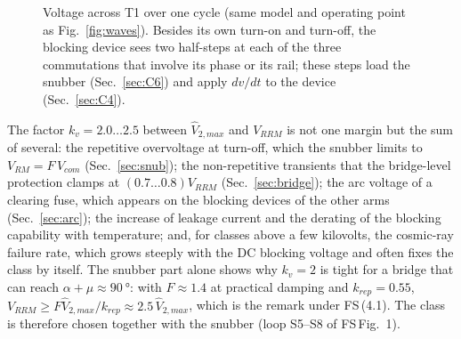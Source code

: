 \documentclass[10pt,a4paper]{scrartcl}
\newcommand{\VRRM}{V_{RRM}}
\newcommand{\fs}[1]{\textsf{FS}\,(#1)}
\newcommand{\fsfig}[1]{\textsf{FS}\,Fig.~#1}
\begin{document}
\begin{figure}[htb]
\caption{Voltage across T1 over one cycle (same model and operating point as Fig.~\ref{fig:waves}). Besides its own turn-on and turn-off, the blocking device sees two half-steps at each of the three commutations that involve its phase or its rail; these steps load the snubber (Sec.~\ref{sec:C6}) and apply $dv/dt$ to the device (Sec.~\ref{sec:C4}).}
\label{fig:vT1}
\end{figure}

The factor $k_v = 2.0\ldots2.5$ between $\hat V_{2,max}$ and $\VRRM$ is not one margin but the sum of several: the repetitive overvoltage at turn-off, which the snubber limits to $V_{RM} = F\,V_{com}$ (Sec.~\ref{sec:snub}); the non-repetitive transients that the bridge-level protection clamps at $(0.7\ldots0.8)\VRRM$ (Sec.~\ref{sec:bridge}); the arc voltage of a clearing fuse, which appears on the blocking devices of the other arms (Sec.~\ref{sec:arc}); the increase of leakage current and the derating of the blocking capability with temperature; and, for classes above a few kilovolts, the cosmic-ray failure rate, which grows steeply with the DC blocking voltage and often fixes the class by itself. The snubber part alone shows why $k_v = 2$ is tight for a bridge that can reach $\alpha+\mu\approx\SI{90}{\degree}$: with $F\approx1.4$ at practical damping and $k_{rep} = 0.55$, $\VRRM \ge F\hat V_{2,max}/k_{rep} \approx 2.5\,\hat V_{2,max}$, which is the remark under \fs{4.1}. The class is therefore chosen together with the snubber (loop S5--S8 of \fsfig{1}).
\end{document}
